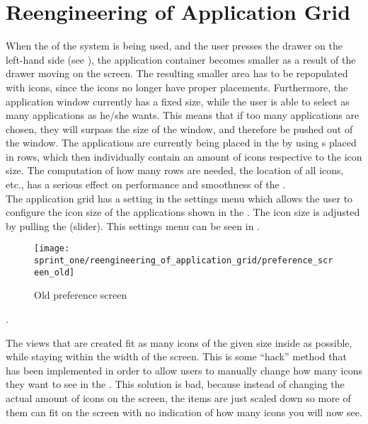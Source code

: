 
\section{Reengineering of Application Grid}
\label{sec:reengineering_of_application_grid}

When the \launcher of the \giraf system is being used, and the user presses the drawer on the left-hand side (see ), the application container becomes smaller as a result of the drawer moving on the screen. The resulting smaller area has to be repopulated with icons, since the icons no longer have proper placements. Furthermore, the application window currently has a fixed size, while the user is able to select as many applications as he/she wants. This means that if too many applications are chosen, they will surpass the size of the window, and therefore be pushed out of the window. The applications are currently being placed in the \launcher by using s placed in rows, which then individually contain an amount of icons respective to the icon size. The computation of how many rows are needed, the location of all icons, etc., has a serious effect on performance and smoothness of the \launcher. \\

The application grid has a setting in the settings menu which allows the user to configure the icon size of the applications shown in the \launcher. The icon size is adjusted by pulling the  (slider). This settings menu can be seen in . \\

\begin{figure}[!htbp]
    \centering
    \texttt{[image: sprint\_one/reengineering\_of\_application\_grid/preference\_screen\_old]}
    \caption{Old preference screen}
    \label{fig:preference_screen_old}
\end{figure}.

The  views that are created fit as many icons of the given size inside as possible, while staying within the width of the screen. This is some ``hack'' method that has been implemented in order to allow users to manually change how many icons they want to see in the \launcher. This solution is bad, because instead of changing the actual amount of icons on the screen, the items are just scaled down so more of them can fit on the screen with no indication of how many icons you will now see.\\

